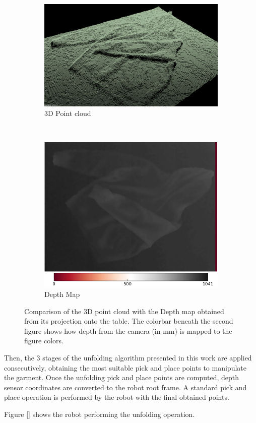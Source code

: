 \begin{figure}[htbp]
	\centering
    \begin{subfigure}[l]{0.49\textwidth}
	    \centering
    	\includegraphics[width=\textwidth]
    	{figures/point-cloud-01.png}
    	\caption{3D Point cloud}
	\end{subfigure}
	~
    \begin{subfigure}[r]{0.49\textwidth}
	    \centering
    	\includegraphics[width=\textwidth]
    	{figures/point-cloud-projection-2.png}
    	\caption{Depth Map}
	\end{subfigure}
    \caption[Comparison of the 3D point cloud with the Depth map obtained from its projection onto the table.]
    {Comparison of the 3D point cloud with the Depth map obtained from its projection onto the table. The colorbar beneath the second figure shows how depth from the camera (in mm) is mapped to the figure colors.}
    \label{fig:point_cloud_and_depth_image}
\end{figure}

Then, the 3 stages of the unfolding algorithm presented in this work are applied consecutively, obtaining the most suitable pick and place points to manipulate the garment. Once the unfolding pick and place points are computed, depth sensor coordinates are converted to the robot root frame. A standard pick and place operation is performed by the robot with the final obtained points.

Figure \ref{} shows the robot performing the unfolding operation.
